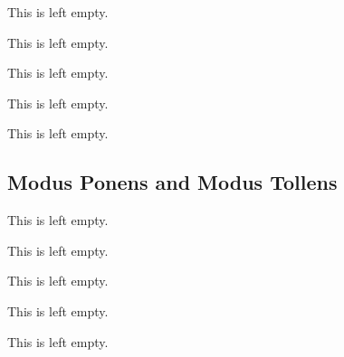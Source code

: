 \begin{remark}
    This is left empty.
\end{remark}

\begin{example}
    This is left empty.
\end{example}

\begin{example}
    This is left empty.
\end{example}

\begin{example}
    This is left empty.
\end{example}

\begin{remark}
    This is left empty.
\end{remark}

\subsection{Modus Ponens and Modus Tollens}

\begin{definition}
    This is left empty.
\end{definition}

\begin{example}
    This is left empty.
\end{example}

\begin{remark}
    This is left empty.
\end{remark}

\begin{example}
    This is left empty.
\end{example}

\begin{definition}
    This is left empty.
\end{definition}